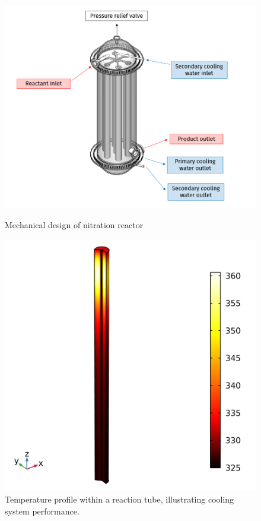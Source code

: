 \begin{figure}
    \centering
    \begin{minipage}[t]{0.45\linewidth}
        \includegraphics[width=\linewidth]{figures/FYD executive sum.PNG}
        \caption{Mechanical design of nitration reactor}
        \label{fig:executivesummaryreactor}
    \end{minipage}\hfill
    \begin{minipage}[t]{0.45\linewidth}
        \includegraphics[width=\linewidth]{chapters/2-reaction/figures/temperature-surface.png}
        \caption{Temperature profile within a reaction tube, illustrating cooling system performance.}
    \end{minipage}
\end{figure}
